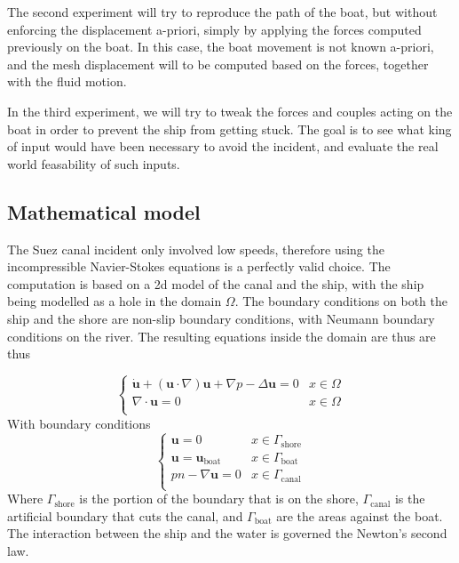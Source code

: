\documentclass[a4paper]{article}
\begin{document}
The second experiment will try to reproduce the path of the boat, but without enforcing the displacement a-priori, simply by applying the forces computed previously on the boat. In this case, the boat movement is not known a-priori, and the mesh displacement will to be computed based on the forces, together with the fluid motion. 

In the third experiment, we will try to tweak the forces and couples acting on the boat in order to prevent the ship from getting stuck. The goal is to see what king of input would have been necessary to avoid the incident, and evaluate the real world feasability of such inputs.


\subsection{Mathematical model}
The Suez canal incident only involved low speeds, therefore using the incompressible Navier-Stokes equations is a perfectly valid choice. The computation is based on a 2d model of the canal and the ship, with the ship being modelled as a hole in the domain $\Omega$. The boundary conditions on both the ship and the shore are non-slip boundary conditions, with Neumann boundary conditions on the river. The resulting equations inside the domain are thus are thus

\[
    \begin{cases}
        \Dot{\bm{u}} + (\bm{u}\cdot \nabla) \bm{u} +\nabla p - \Delta \bm{u} = 0 & x \in \Omega \\
        \nabla \cdot \bm{u} = 0  & x \in \Omega\\
    \end{cases}
\]
With boundary conditions
\[
    \begin{cases}
        \bm{u} = 0  & x\in \Gamma_\text{shore} \\
        \bm{u} = \bm{u}_\text{boat} & x\in \Gamma_\text{boat}\\
        pn - \nabla \bm{u} = 0  & x\in \Gamma_\text{canal} \\
    \end{cases}
\]
Where $\Gamma_\text{shore}$ is the portion of the boundary that is on the shore, $\Gamma_\text{canal}$ is the artificial boundary that cuts the canal, and $\Gamma_\text{boat}$ are the areas against the boat. The interaction between the ship and the water is governed the Newton's second law.
\end{document}
